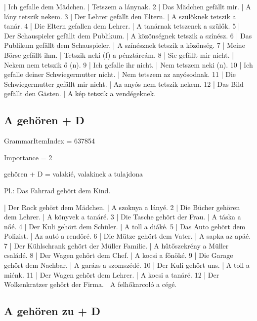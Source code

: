 \documentclass{article}
\newenvironment{desc}{\verbatim}{\endverbatim}
\newenvironment{exmp}{\verbatim}{\endverbatim}
\begin{document}
\begin{exmp}
1 | Ich gefalle dem Mädchen. | Tetszem a lánynak.
2 | Das Mädchen gefällt mir. | A lány tetszik nekem.
3 | Der Lehrer gefällt den Eltern. | A szülőknek tetszik a tanár.
4 | Die Eltern gefallen dem Lehrer. | A tanárnak tetszenek a szülők.
5 | Der Schauspieler gefällt dem Publikum. | A közönségnek tetszik a színész.
6 | Das Publikum gefällt dem Schauspieler. | A színésznek tetszik a közönség.
7 | Meine Börse gefällt ihm. | Tetszik neki (f) a pénztárcám.
8 | Sie gefällt mir nicht. | Nekem nem tetszik ő (n).
9 | Ich gefalle ihr nicht. | Nem tetszem neki (n).
10 | Ich gefalle deiner Schwiegermutter nicht. | Nem tetszem az anyósodnak.
11 | Die Schwiegermutter gefällt mir nicht. | Az anyós nem tetszik nekem.
12 | Das Bild gefällt den Gästen. | A kép tetszik a vendégeknek.
\end{exmp}

\subsection{A gehören + D}

GrammarItemIndex = 637854

Importance = 2

\begin{desc}
gehören + D = valakié, valakinek a tulajdona

Pl.: Das Fahrrad gehört dem Kind.
\end{desc}

\begin{exmp}
1 | Der Rock gehört dem Mädchen. | A szoknya a lányé.
2 | Die Bücher gehören dem Lehrer. | A könyvek a tanáré.
3 | Die Tasche gehört der Frau. | A táska a nőé.
4 | Der Kuli gehört dem Schüler. | A toll a diáké.
5 | Das Auto gehört dem Polizist. | Az autó a rendőré.
6 | Die Mütze gehört dem Vater. | A sapka az apáé.
7 | Der Kühlschrank gehört der Müller Familie. | A hűtőszekrény a Müller családé.
8 | Der Wagen gehört dem Chef. | A kocsi a főnöké.
9 | Die Garage gehört dem Nachbar. | A garázs a szomszédé.
10 | Der Kuli gehört uns. | A toll a miénk.
11 | Der Wagen gehört dem Lehrer. | A kocsi a tanáré.
12 | Der Wolkenkratzer gehört der Firma. | A felhőkarcoló a cégé.
\end{exmp}

\subsection{A gehören zu + D}
\end{document}

